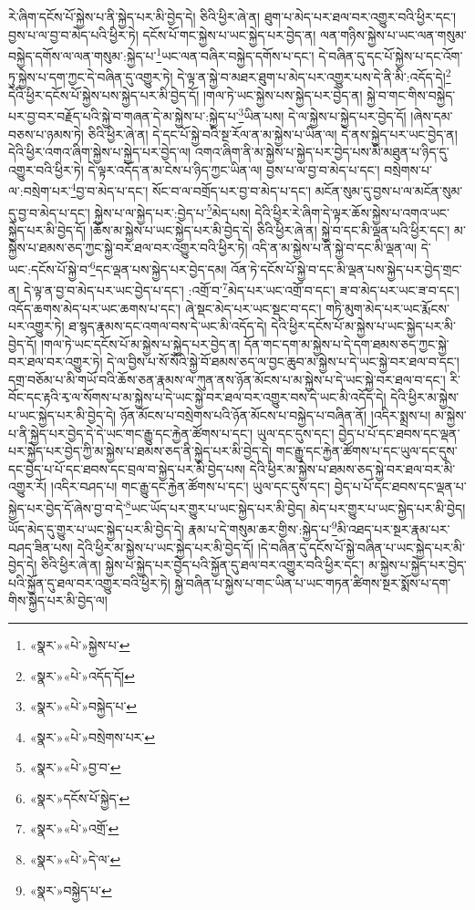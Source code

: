 རེ་ཞིག་དངོས་པོ་སྐྱེས་པ་ནི་སྐྱེད་པར་མི་བྱེད་དེ། ཅིའི་ཕྱིར་ཞེ་ན། ཐུག་པ་མེད་པར་ཐལ་བར་འགྱུར་བའི་ཕྱིར་དང་། བྱས་པ་ལ་བྱ་བ་མེད་པའི་ཕྱིར་ཏེ། དངོས་པོ་གང་སྐྱེས་པ་ཡང་སྐྱེད་པར་བྱེད་ན། ལན་གཉིས་སྐྱེས་པ་ཡང་ལན་གསུམ་བསྐྱེད་དགོས་ལ་ལན་གསུམ་:སྐྱེད་པ་\footnote{«སྣར་»«པེ་»སྐྱེས་པ་}ཡང་ལན་བཞིར་བསྐྱེད་དགོས་པ་དང་། དེ་བཞིན་དུ་དང་པོ་སྐྱེས་པ་དང་འོག་ཏུ་སྐྱེས་པ་དག་ཀྱང་དེ་བཞིན་དུ་འགྱུར་ཏེ། དེ་ལྟ་ན་སྐྱེ་བ་མཐར་ཐུག་པ་མེད་པར་འགྱུར་པས་དེ་ནི་མི་:འདོད་དེ།\footnote{«སྣར་»«པེ་»འདོད་དོ།} དེའི་ཕྱིར་དངོས་པོ་སྐྱེས་པས་སྐྱེད་པར་མི་བྱེད་དོ། །གལ་ཏེ་ཡང་སྐྱེས་པས་སྐྱེད་པར་བྱེད་ན། སྐྱེ་བ་གང་གིས་བསྐྱེད་པར་བྱ་བར་བརྗོད་པའི་སྐྱེ་བ་གཞན་དེ་མ་སྐྱེས་པ་:སྐྱེད་པ་\footnote{«སྣར་»«པེ་»བསྐྱེད་པ་}ཡིན་པས། དེ་ལ་སྐྱེས་པ་སྐྱེད་པར་བྱེད་དོ། །ཞེས་དམ་བཅས་པ་ཉམས་ཏེ། ཅིའི་ཕྱིར་ཞེ་ན། དེ་དང་པོ་སྐྱེ་བའི་སྔ་རོལ་ན་མ་སྐྱེས་པ་ཡིན་ལ། དེ་ནས་སྐྱེད་པར་ཡང་བྱེད་ན། དེའི་ཕྱིར་འགའ་ཞིག་སྐྱེས་པ་སྐྱེད་པར་བྱེད་ལ། འགའ་ཞིག་ནི་མ་སྐྱེས་པ་སྐྱེད་པར་བྱེད་པས་མི་མཐུན་པ་ཉིད་དུ་འགྱུར་བའི་ཕྱིར་ཏེ། དེ་ལྟར་འདོད་ན་མ་ངེས་པ་ཉིད་ཀྱང་ཡིན་ལ། བྱས་པ་ལ་བྱ་བ་མེད་པ་དང་། བསྲེགས་པ་ལ་:བསྲེག་པར་\footnote{«སྣར་»«པེ་»བསྲེགས་པར་}བྱ་བ་མེད་པ་དང་། སོང་བ་ལ་བགྲོད་པར་བྱ་བ་མེད་པ་དང་། མངོན་སུམ་དུ་བྱས་པ་ལ་མངོན་སུམ་དུ་བྱ་བ་མེད་པ་དང་། སྐྱེས་པ་ལ་སྐྱེད་པར་:བྱེད་པ་\footnote{«སྣར་»«པེ་»བྱ་བ་}མེད་པས། དེའི་ཕྱིར་རེ་ཞིག་དེ་ལྟར་ཆོས་སྐྱེས་པ་འགའ་ཡང་སྐྱེད་པར་མི་བྱེད་དོ། །ཆོས་མ་སྐྱེས་པ་ཡང་སྐྱེད་པར་མི་བྱེད་དེ། ཅིའི་ཕྱིར་ཞེ་ན། སྐྱེ་བ་དང་མི་ལྡན་པའི་ཕྱིར་དང་། མ་སྐྱེས་པ་ཐམས་ཅད་ཀྱང་སྐྱེ་བར་ཐལ་བར་འགྱུར་བའི་ཕྱིར་ཏེ། འདི་ན་མ་སྐྱེས་པ་ནི་སྐྱེ་བ་དང་མི་ལྡན་ལ། དེ་ཡང་:དངོས་པོ་སྐྱེ་བ་\footnote{«སྣར་»དངོས་པོ་སྐྱེད་}དང་ལྡན་པས་སྐྱེད་པར་བྱེད་དམ། འོན་ཏེ་དངོས་པོ་སྐྱེ་བ་དང་མི་ལྡན་པས་སྐྱེད་པར་བྱེད་གྲང་ན། དེ་ལྟ་ན་བྱ་བ་མེད་པར་ཡང་བྱེད་པ་དང་། :འགྲོ་བ་\footnote{«སྣར་»«པེ་»འགྲོ་}མེད་པར་ཡང་འགྲོ་བ་དང་། ཟ་བ་མེད་པར་ཡང་ཟ་བ་དང་། འདོད་ཆགས་མེད་པར་ཡང་ཆགས་པ་དང་། ཞེ་སྡང་མེད་པར་ཡང་སྡང་བ་དང་། གཏི་མུག་མེད་པར་ཡང་རྨོངས་པར་འགྱུར་ཏེ། ཐ་སྙད་རྣམས་དང་འགལ་བས་དེ་ཡང་མི་འདོད་དེ། དེའི་ཕྱིར་དངོས་པོ་མ་སྐྱེས་པ་ཡང་སྐྱེད་པར་མི་བྱེད་དོ། །གལ་ཏེ་ཡང་དངོས་པོ་མ་སྐྱེས་པ་སྐྱེད་པར་བྱེད་ན། དོན་གང་དག་མ་སྐྱེས་པ་དེ་དག་ཐམས་ཅད་ཀྱང་སྐྱེ་བར་ཐལ་བར་འགྱུར་ཏེ། དེ་ལ་བྱིས་པ་སོ་སོའི་སྐྱེ་བོ་ཐམས་ཅད་ལ་བྱང་ཆུབ་མ་སྐྱེས་པ་དེ་ཡང་སྐྱེ་བར་ཐལ་བ་དང་། དགྲ་བཅོམ་པ་མི་གཡོ་བའི་ཆོས་ཅན་རྣམས་ལ་ཀུན་ནས་ཉོན་མོངས་པ་མ་སྐྱེས་པ་དེ་ཡང་སྐྱེ་བར་ཐལ་བ་དང་། རི་བོང་དང་རྟའི་རྭ་ལ་སོགས་པ་མ་སྐྱེས་པ་དེ་ཡང་སྐྱེ་བར་ཐལ་བར་འགྱུར་བས་དེ་ཡང་མི་འདོད་དེ། དེའི་ཕྱིར་མ་སྐྱེས་པ་ཡང་སྐྱེད་པར་མི་བྱེད་དེ། ཉོན་མོངས་པ་བསྲེགས་པའི་ཉོན་མོངས་པ་བསྐྱེད་པ་བཞིན་ནོ། །འདིར་སྨྲས་པ། མ་སྐྱེས་པ་ནི་སྐྱེད་པར་བྱེད་དེ་དེ་ཡང་གང་རྒྱུ་དང་རྐྱེན་ཚོགས་པ་དང་། ཡུལ་དང་དུས་དང་། བྱེད་པ་པོ་དང་ཐབས་དང་ལྡན་པར་སྐྱེད་པར་བྱེད་ཀྱི་མ་སྐྱེས་པ་ཐམས་ཅད་ནི་སྐྱེད་པར་མི་བྱེད་དེ། གང་རྒྱུ་དང་རྐྱེན་ཚོགས་པ་དང་ཡུལ་དང་དུས་དང་བྱེད་པ་པོ་དང་ཐབས་དང་བྲལ་བ་སྐྱེད་པར་མི་བྱེད་པས། དེའི་ཕྱིར་མ་སྐྱེས་པ་ཐམས་ཅད་སྐྱེ་བར་ཐལ་བར་མི་འགྱུར་རོ། །འདིར་བཤད་པ། གང་རྒྱུ་དང་རྐྱེན་ཚོགས་པ་དང་། ཡུལ་དང་དུས་དང་། བྱེད་པ་པོ་དང་ཐབས་དང་ལྡན་པ་སྐྱེད་པར་བྱེད་དོ་ཞེས་བྱ་བ་དེ་\footnote{«སྣར་»«པེ་»དེ་ལ་}ཡང་ཡོད་པར་གྱུར་པ་ཡང་སྐྱེད་པར་མི་བྱེད། མེད་པར་གྱུར་པ་ཡང་སྐྱེད་པར་མི་བྱེད། ཡོད་མེད་དུ་གྱུར་པ་ཡང་སྐྱེད་པར་མི་བྱེད་དེ། རྣམ་པ་དེ་གསུམ་ཆར་གྱིས་:སྐྱེད་པ་\footnote{«སྣར་»བསྐྱེད་པ་}མི་འཐད་པར་སྔར་རྣམ་པར་བཤད་ཟིན་པས། དེའི་ཕྱིར་མ་སྐྱེས་པ་ཡང་སྐྱེད་པར་མི་བྱེད་དོ། །དེ་བཞིན་དུ་དངོས་པོ་སྐྱེ་བཞིན་པ་ཡང་སྐྱེད་པར་མི་བྱེད་དེ། ཅིའི་ཕྱིར་ཞེ་ན། སྐྱེས་པ་སྐྱེད་པར་བྱེད་པའི་སྐྱོན་དུ་ཐལ་བར་འགྱུར་བའི་ཕྱིར་དང་། མ་སྐྱེས་པ་སྐྱེད་པར་བྱེད་པའི་སྐྱོན་དུ་ཐལ་བར་འགྱུར་བའི་ཕྱིར་ཏེ། སྐྱེ་བཞིན་པ་སྐྱེས་པ་གང་ཡིན་པ་ཡང་གཏན་ཚིགས་སྔར་སྨོས་པ་དག་གིས་སྐྱེད་པར་མི་བྱེད་ལ། 